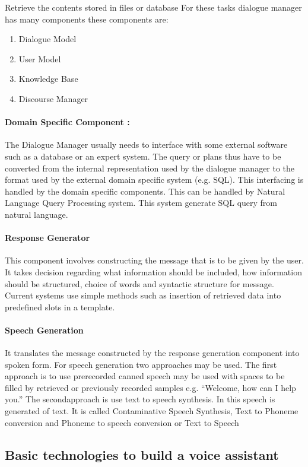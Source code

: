 \documentclass[12pt,a4paper]{article}
\begin{document}
Retrieve the contents stored in files or database
For these tasks dialogue manager has many
components these components are:
\begin{enumerate}
\item Dialogue Model
\item User Model
\item Knowledge Base
\item Discourse Manager
\end{enumerate}

\paragraph{Domain Specific Component :}
The Dialogue Manager usually needs to
interface with some external software such as a
database or an expert system. The query or plans
thus have to be converted from the internal
representation used by the dialogue manager to the
format used by the external domain specific system
(e.g. SQL). This interfacing is handled by the domain
specific components. This can be handled by Natural
Language Query Processing system. This system
generate SQL query from natural language.

\paragraph{Response Generator}
This component involves constructing the
message that is to be given by the user. It takes
decision regarding what information should be
included, how information should be structured,
choice of words and syntactic structure for message.
Current systems use simple methods such as
insertion of retrieved data into predefined slots in a
template.
\paragraph{Speech Generation}
It translates the message constructed by the
response generation component into spoken form.
For speech generation two approaches may be used.
The first approach is to use prerecorded canned
speech may be used with spaces to be filled by
retrieved or previously recorded samples e.g.
“Welcome, how can I help you.” The secondapproach is use text to speech synthesis. In this
speech is generated of text. It is called Contaminative
Speech Synthesis, Text to Phoneme conversion and
Phoneme to speech conversion or Text to Speech

\newpage
\begin{center}
\section{Basic technologies to build a voice assistant}
\end{center}
\end{document}
